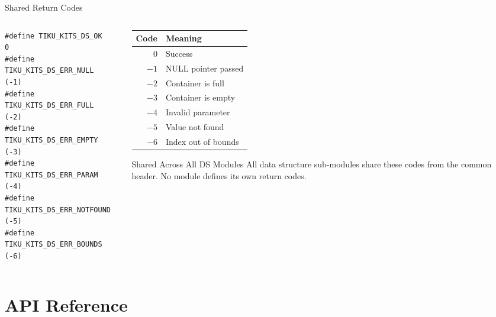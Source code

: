 \documentclass[aspectratio=169, 10pt]{beamer}
\begin{document}
\begin{frame}[fragile]{Shared Return Codes}
\begin{columns}[T]
\begin{column}{0.48\textwidth}
\begin{lstlisting}[style=cstyle,
  title={ds/tiku\_kits\_ds.h --- return codes}]
#define TIKU_KITS_DS_OK           0
#define TIKU_KITS_DS_ERR_NULL    (-1)
#define TIKU_KITS_DS_ERR_FULL    (-2)
#define TIKU_KITS_DS_ERR_EMPTY   (-3)
#define TIKU_KITS_DS_ERR_PARAM   (-4)
#define TIKU_KITS_DS_ERR_NOTFOUND (-5)
#define TIKU_KITS_DS_ERR_BOUNDS  (-6)
\end{lstlisting}
\end{column}

\begin{column}{0.48\textwidth}
\begin{table}
\centering
\small
\begin{tabular}{@{}rl@{}}
\toprule
\textbf{Code} & \textbf{Meaning} \\
\midrule
0   & Success \\
$-1$ & NULL pointer passed \\
$-2$ & Container is full \\
$-3$ & Container is empty \\
$-4$ & Invalid parameter \\
$-5$ & Value not found \\
$-6$ & Index out of bounds \\
\bottomrule
\end{tabular}
\end{table}

\vspace{0.3em}
\begin{alertblock}{Shared Across All DS Modules}
All data structure sub-modules share these codes from the common header.
No module defines its own return codes.
\end{alertblock}
\end{column}
\end{columns}
\end{frame}

\section{API Reference}
\end{document}
